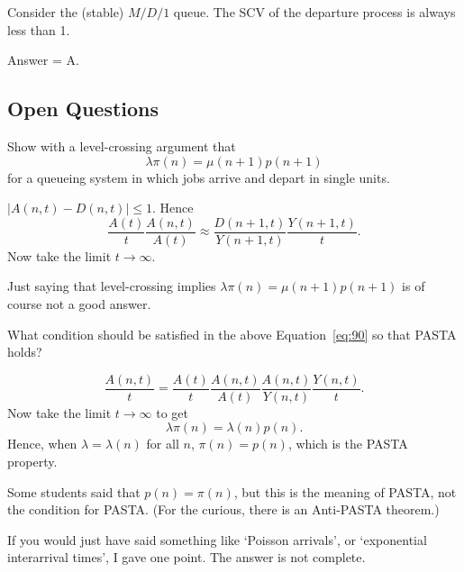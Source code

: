 \begin{exercise}[201907]
Consider the (stable) $M/D/1$ queue. The SCV of the departure process is always less than 1. 
\begin{solution}
Answer = A.
\end{solution}
\end{exercise}

  
\subsection{Open Questions}

\begin{exercise}[201704] 
Show with a level-crossing argument that
  \begin{equation}\label{eq:90}
  \lambda \pi(n) = \mu(n+1) p(n+1)
  \end{equation}
  for a queueing system in which jobs arrive and depart in single
  units.
\begin{solution}
    $|A(n,t)-D(n,t)| \leq 1$. Hence
    \begin{equation*}
      \frac{A(t)}{t} \frac{A(n,t)}{A(t)} \approx 
      \frac{D(n+1, t)}{Y(n+1,t)} \frac{Y(n+1,t)}{t}.
    \end{equation*}
Now take the limit $t\to \infty$.

Just saying that level-crossing implies $\lambda \pi(n) = \mu(n+1)p(n+1)$ is of course not a good answer. 
\end{solution}
\end{exercise}

\begin{exercise}[201704]
  What condition should be satisfied in the above Equation~\eqref{eq:90} so that PASTA holds? 
\begin{solution}
    \begin{equation*}
\frac{A(n,t)}t =  \frac{A(t)}{t} \frac{A(n,t)}{A(t)}   \frac{A(n, t)}{Y(n,t)} \frac{Y(n,t)}{t}.
    \end{equation*}
Now take the limit $t\to \infty$ to get
    \begin{equation*}
\lambda \pi(n) = \lambda(n)p(n).
    \end{equation*}
Hence, when $\lambda=\lambda(n)$ for all $n$, $\pi(n)=p(n)$, which is the PASTA property.


Some students said that $p(n)=\pi(n)$, but this is the meaning of PASTA, not the condition for PASTA. (For the curious, there is an Anti-PASTA theorem.)  

If you would just have said something like `Poisson arrivals', or `exponential interarrival times', I gave one point. The answer is not complete. 
\end{solution}
\end{exercise}

